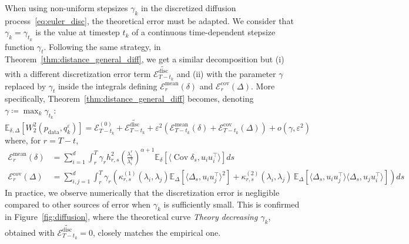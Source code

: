 \documentclass[11pt]{article}
\newcommand{\eqdef}{\coloneqq}
\newcommand{\EE}{\mathbb{E}}
\newcommand{\cov}{\operatorname{Cov}}
\begin{document}
When using non-uniform stepsizes $\gamma_k$ in the discretized diffusion process~\eqref{eq:euler_disc}, the theoretical error must be adapted. We consider that $\gamma_k = \gamma_{t_k}$ is the value at timestep $t_k $ of a continuous time-dependent stepsize function $\gamma_t$. Following the same strategy, in Theorem~\ref{thm:distance_general_diff}, we get a similar decomposition but (i) with a different discretization error term $\tilde{\mathcal{E}^{\text{disc}}_{T-t_k}}$ and (ii) with the parameter $\gamma$ replaced by $\gamma_t$ inside the integrals defining $\mathcal{E}_{r}^{\text{mean}}(\delta)$ and $\mathcal{E}_{r}^{\text{cov}}(\Delta)$. More specifically, Theorem~\ref{thm:distance_general_diff} becomes, denoting $\gamma \eqdef \max_k \gamma_{t_k}$:
\begin{equation*}
\EE_{\delta, \Delta}  \left[ W_2^2(p_\mathrm{data},q_k^\varepsilon) \right] =  \mathcal{E}^{(0)}_{T-t_k} +  \tilde{\mathcal{E}^{\text{disc}}_{T-t_k}} + \varepsilon^2 \left( \mathcal{E}_{T-t_k}^{\text{mean}}(\delta) + \mathcal{E}_{T-t_k}^{\text{cov}}(\Delta) \right) + o(\gamma, \varepsilon^2)
\end{equation*}
where, for $r = T-t$,
\begin{align*}
\mathcal{E}_{r}^{\text{mean}}(\delta)  &= \sum_{i=1}^d \int_{r}^{T} \gamma_r h_{r,s}^2 \left(\frac{\lambda_i^{r}}{\lambda_i^{s}}\right)^{\alpha+1} \EE_{\delta} \left[\langle \cov \delta_{s}, u_i u_i^\top \rangle\right]ds \\
\mathcal{E}_{r}^{\text{cov}}(\Delta)  &=  \sum_{i,j=1}^d  \int_{r}^{T} \gamma_r \! \!\left( \kappa^{(1)}_{r,s}(\lambda_i, \lambda_j)  \EE_{\Delta}\!\left[\langle \Delta_s, u_iu_j^\top \rangle^2\right]  + \!\kappa^{(2)}_{r,s}(\lambda_i, \lambda_j) \, \EE_{\Delta}\!\left[\langle \Delta_s, u_iu_j^\top \rangle \langle \Delta_s, u_ju_i^\top \rangle \right] \right) ds
\end{align*}
In practice, we observe numerically that the discretization error is negligible compared to other sources of error when $\gamma_k$ is sufficiently small. This is confirmed in Figure~\ref{fig:diffusion}, where the theoretical curve \emph{Theory decreasing $\gamma_k$}, obtained with $\tilde{\mathcal{E}^{\text{disc}}_{T-t_k}} = 0$, closely matches the empirical one.
\end{document}
